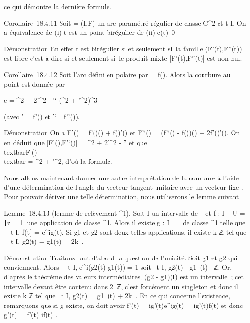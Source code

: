 ce qui démontre la dernière formule.

Corollaire~18.4.11 Soit \Gamma = (I,F) un arc paramétré régulier de classe
C^2 et t \in I. On a équivalence de (i) t est un point
birégulier de \Gamma (ii) c\Gamma(t)\neq~0

Démonstration En effet t est birégulier si et seulement si~la famille
(F'(t),F''(t)) est libre c'est-à-dire si et seulement si~le produit
mixte {[}F'(t),F''(t){]} est non nul.

Corollaire~18.4.12 Soit \Gamma l'arc défini en polaire par \rho = f(\theta). Alors la
courbure au point \theta est donnée par

c = \rho^2 + 2\rho'^2 - \rho\rho'`\over
(\rho^2 + \rho'^2)^3

(avec \rho' = f'(\theta) et \rho'`= f''(\theta)).

Démonstration On a F'(\theta) = f'(\theta)\vecu(\theta) +
f(\theta)\vecu'(\theta) et F'`(\theta) = (f'`(\theta) -
f(\theta))\vecu(\theta) + 2f'(\theta)\vecu'(\theta).
On en déduit que {[}F'(\theta),F'`(\theta){]} = \rho^2 + 2\rho'^2
- \rho\rho'' et que \\textbar{}F'(\theta)\\textbar{}
= \sqrt\rho^2  + \rho'^2, d'où la
formule.

Nous allons maintenant donner une autre interprétation de la courbure à
l'aide d'une détermination de l'angle \phi du vecteur tangent unitaire
\vect avec un vecteur fixe \vec\imath.
Pour pouvoir dériver une telle détermination, nous utiliserons le lemme
suivant

Lemme~18.4.13 (lemme de relèvement ^1). Soit I un intervalle
de ~ et f : I \rightarrow~ U = \z \in
{}∣\textbar{}z\textbar{} = 1\
une application de classe ^1. Alors il existe g : I \rightarrow~ ~ de
classe \mathcal{C}^1 telle que \forall~~t \in I, f(t) =
e^ig(t). Si g1 et g2 sont deux telles
applications, il existe k \in ℤ tel que \forall~~t \in I,
g2(t) = g1(t) + 2k\pi~.

Démonstration Traitons tout d'abord la question de l'unicité. Soit
g1 et g2 qui conviennent. Alors
\forall~~t \in I,
e^i(g2(t)-g1(t)) = 1 soit
\forall~t \in I, g2(t) - g1~(t) \pi~ℤ. Or, d'après le théorème des valeurs intermédiaires, (g2 -
g1)(I) est un intervalle~; cet intervalle devant être contenu
dans 2\pi~ℤ, c'est forcément un singleton et donc il existe k \in ℤ tel que
\forall~t \in I, g2(t) = g1~(t) +
2k\pi~. En ce qui concerne l'existence, remarquons que si g existe, on doit
avoir f'(t) = ig'(t)e^ig(t) = ig'(t)f(t) et donc g'(t) =
f'(t) \over if(t) .

